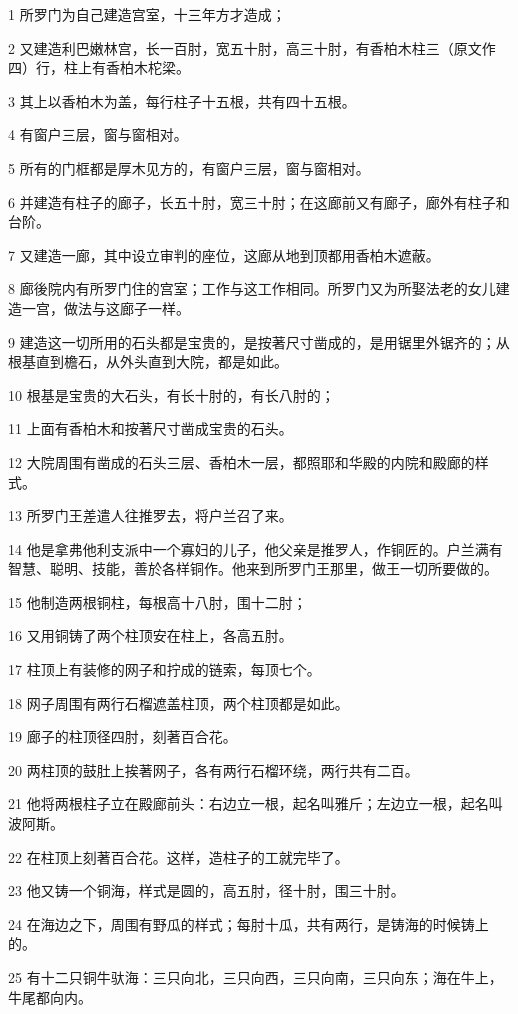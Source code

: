 \par 1 所罗门为自己建造宫室，十三年方才造成；
\par 2 又建造利巴嫩林宫，长一百肘，宽五十肘，高三十肘，有香柏木柱三（原文作四）行，柱上有香柏木柁梁。
\par 3 其上以香柏木为盖，每行柱子十五根，共有四十五根。
\par 4 有窗户三层，窗与窗相对。
\par 5 所有的门框都是厚木见方的，有窗户三层，窗与窗相对。
\par 6 并建造有柱子的廊子，长五十肘，宽三十肘；在这廊前又有廊子，廊外有柱子和台阶。
\par 7 又建造一廊，其中设立审判的座位，这廊从地到顶都用香柏木遮蔽。
\par 8 廊後院内有所罗门住的宫室；工作与这工作相同。所罗门又为所娶法老的女儿建造一宫，做法与这廊子一样。
\par 9 建造这一切所用的石头都是宝贵的，是按著尺寸凿成的，是用锯里外锯齐的；从根基直到檐石，从外头直到大院，都是如此。
\par 10 根基是宝贵的大石头，有长十肘的，有长八肘的；
\par 11 上面有香柏木和按著尺寸凿成宝贵的石头。
\par 12 大院周围有凿成的石头三层、香柏木一层，都照耶和华殿的内院和殿廊的样式。
\par 13 所罗门王差遣人往推罗去，将户兰召了来。
\par 14 他是拿弗他利支派中一个寡妇的儿子，他父亲是推罗人，作铜匠的。户兰满有智慧、聪明、技能，善於各样铜作。他来到所罗门王那里，做王一切所要做的。
\par 15 他制造两根铜柱，每根高十八肘，围十二肘；
\par 16 又用铜铸了两个柱顶安在柱上，各高五肘。
\par 17 柱顶上有装修的网子和拧成的链索，每顶七个。
\par 18 网子周围有两行石榴遮盖柱顶，两个柱顶都是如此。
\par 19 廊子的柱顶径四肘，刻著百合花。
\par 20 两柱顶的鼓肚上挨著网子，各有两行石榴环绕，两行共有二百。
\par 21 他将两根柱子立在殿廊前头：右边立一根，起名叫雅斤；左边立一根，起名叫波阿斯。
\par 22 在柱顶上刻著百合花。这样，造柱子的工就完毕了。
\par 23 他又铸一个铜海，样式是圆的，高五肘，径十肘，围三十肘。
\par 24 在海边之下，周围有野瓜的样式；每肘十瓜，共有两行，是铸海的时候铸上的。
\par 25 有十二只铜牛驮海：三只向北，三只向西，三只向南，三只向东；海在牛上，牛尾都向内。
